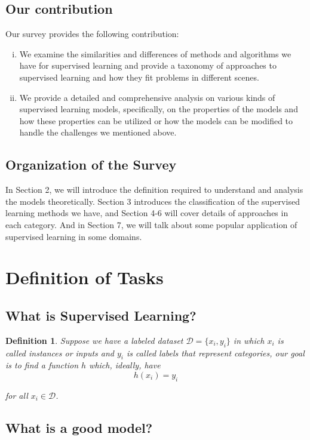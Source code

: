 \documentclass[10pt,twocolumn,letterpaper]{article}
\newtheorem{definition}{Definition}[section]
\begin{document}
\subsection{Our contribution}
	Our survey provides the following contribution:
	\begin{enumerate}[(i).] 
		\item We examine the similarities and differences of methods and algorithms we have for supervised learning and provide a taxonomy of approaches to supervised learning and how they fit problems in different scenes.
		\item We provide a detailed and comprehensive analysis on various kinds of supervised learning models, specifically, on the properties of the models and how these properties can be utilized or how the models can be modified to handle the challenges we mentioned above.
	\end{enumerate}

\subsection{Organization of the Survey}
In Section 2, we will introduce the definition required to understand and analysis the models theoretically. Section 3 introduces the classification of the supervised learning methods we have, and Section 4-6 will cover details of approaches in each category. And in Section 7, we will talk about some popular application of supervised learning in some domains.

\section{Definition of Tasks}

\subsection{What is Supervised Learning?}

\begin{definition}
	Suppose we have a labeled dataset $\mathcal{D} = \{x_i, y_i\}$ in which $x_i$ is called instances or inputs and $y_i$ is called labels that represent categories, our goal is to find a function $h$ which, ideally, have 
		\[h(x_i) = y_i\]
		
		for all $x_i \in \mathcal{D}$.
\end{definition}

\subsection{What is a good model?}
\end{document}
